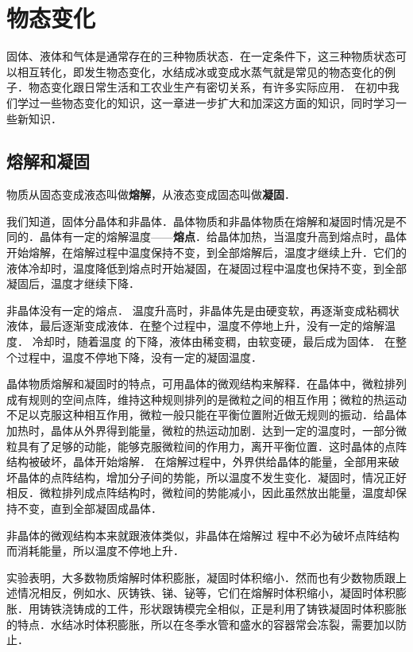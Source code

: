 \chapter{物态变化}\label{chapter-change-of-state-of-matter}

固体、液体和气体是通常存在的三种物质状态．在一定条件下，这三种物质状态可以相互转化，即发生物态变化，水结成冰或变成水蒸气就是常见的物态变化的例子．物态变化跟日常生活和工农业生产有密切关系，有许多实际应用．
在初中我们学过一些物态变化的知识，这一章进一步扩大和加深这方面的知识，同时学习一些新知识．

\section{熔解和凝固}
物质从固态变成液态叫做\textbf{熔解}，从液态变成固态叫做\textbf{凝固}．

我们知道，固体分晶体和非晶体．晶体物质和非晶体物质在熔解和凝固时情况是不同的．晶体有一定的熔解温度——\textbf{熔点}．给晶体加热，当温度升高到熔点时，晶体开始熔解，在熔解过程中温度保持不变，到全部熔解后，温度才继续上升．它们的液体冷却时，温度降低到熔点时开始凝固，在凝固过程中温度也保持不变，到全部凝固后，温度才继续下降．

非晶体没有一定的熔点．
温度升高时，非晶体先是由硬变软，再逐渐变成粘稠状液体，最后逐渐变成液体．在整个过程中，温度不停地上升，没有一定的熔解温度．
冷却时，随着温度
的下降，液体由稀变稠，由软变硬，最后成为固体．
在整个过程中，温度不停地下降，没有一定的凝固温度．

晶体物质熔解和凝固时的特点，可用晶体的微观结构来解释．在晶体中，微粒排列成有规则的空间点阵，维持这种规则排列的是微粒之间的相互作用；微粒的热运动不足以克服这种相互作用，微粒一般只能在平衡位置附近做无规则的振动．给晶体加热时，晶体从外界得到能量，微粒的热运动加剧．达到一定的温度时，一部分微粒具有了足够的动能，能够克服微粒间的作用力，离开平衡位置．这时晶体的点阵结构被破坏，晶体开始熔解．
在熔解过程中，外界供给晶体的能量，全部用来破坏晶体的点阵结构，增加分子间的势能，所以温度不发生变化．凝固时，情况正好相反．微粒排列成点阵结构时，微粒间的势能减小，因此虽然放出能量，温度却保持不变，直到全部凝固成晶体．

非晶体的微观结构本来就跟液体类似，非晶体在熔解过
程中不必为破坏点阵结构而消耗能量，所以温度不停地上升．

实验表明，大多数物质熔解时体积膨胀，凝固时体积缩小．然而也有少数物质跟上述情况相反，例如水、灰铸铁、锑、铋等，它们在熔解时体积缩小，凝固时体积膨胀．用铸铁浇铸成的工件，形状跟铸模完全相似，正是利用了铸铁凝固时体积膨胀的特点．水结冰时体积膨胀，所以在冬季水管和盛水的容器常会冻裂，需要加以防止．

